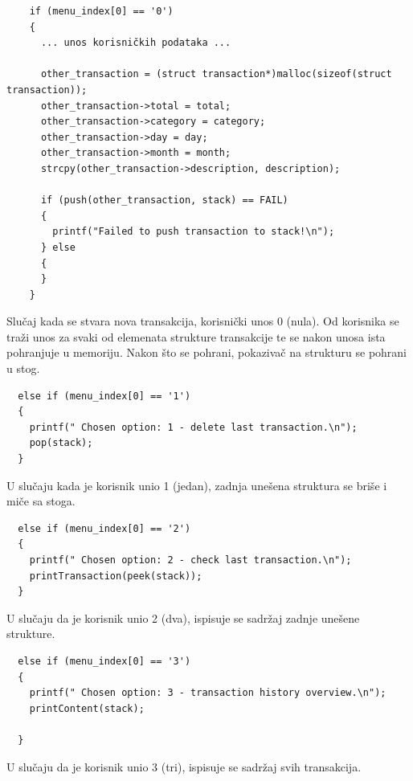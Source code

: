 \documentclass[12pt, letterpaper]{article}
\begin{document}
  \begin{verbatim}
    if (menu_index[0] == '0')
    {
      ... unos korisničkih podataka ...

      other_transaction = (struct transaction*)malloc(sizeof(struct transaction));
      other_transaction->total = total;
      other_transaction->category = category;
      other_transaction->day = day;
      other_transaction->month = month;
      strcpy(other_transaction->description, description);

      if (push(other_transaction, stack) == FAIL)
      {
        printf("Failed to push transaction to stack!\n");
      } else
      {
      }
    }
  \end{verbatim}
  Slučaj kada se stvara nova transakcija, korisnički unos 0 (nula). Od korisnika se traži unos za svaki od elemenata strukture transakcije te se nakon unosa ista pohranjuje u memoriju. Nakon što se pohrani, pokazivač na strukturu se pohrani u stog.

  \begin{verbatim}
  else if (menu_index[0] == '1')
  {
    printf(" Chosen option: 1 - delete last transaction.\n");
    pop(stack);
  }
  \end{verbatim}
  U slučaju kada je korisnik unio 1 (jedan), zadnja unešena struktura se briše i miče sa stoga.
  
  \begin{verbatim}
  else if (menu_index[0] == '2')
  {
    printf(" Chosen option: 2 - check last transaction.\n");
    printTransaction(peek(stack));
  }  
  \end{verbatim}
  U slučaju da je korisnik unio 2 (dva), ispisuje se sadržaj zadnje unešene strukture.


  \begin{verbatim}
  else if (menu_index[0] == '3')
  {
    printf(" Chosen option: 3 - transaction history overview.\n");
    printContent(stack);

  }     
  \end{verbatim}
  U slučaju da je korisnik unio 3 (tri), ispisuje se sadržaj svih transakcija.
\end{document}
